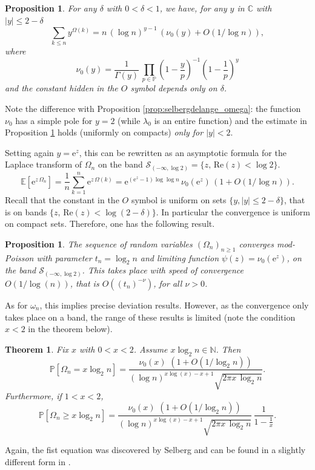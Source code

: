 \documentclass[12pt,a4paper,reqno]{amsart}
\newtheorem{theorem}[lemma]{Theorem}
\newtheorem{proposition}[lemma]{Proposition}
\theoremstyle{remark}
\newcommand{\N}{\mathbb{N}}
\newcommand{\C}{\mathbb{C}}
\newcommand{\E}{\mathrm{e}}
\newcommand{\esper}{\mathbb{E}}
\newcommand{\proba}{\mathbb{P}}
\renewcommand{\Re}{\mathrm{Re}}
\begin{document}
\begin{proposition}\cite[Section II.6, Theorem 2]{Ten95}
For any $\delta$ with $0<\delta<1$, we have, for any $y$ in $\C$ with $|y| \le 2-\delta$
\[ \sum_{k \le n} y^{\Omega(k)} = n\, (\log n)^{y-1} \, (\nu_0(y) +O(1/\log n)), \]
where
\[\nu_0(y)= \frac{1}{\Gamma(y)} \, \prod_{p \in \mathbb{P}} \left(1 - \frac{y}{p} \right)^{-1}\left( 1- \frac{1}{p} \right)^y \]
and the constant hidden in the $O$ symbol depends only on $\delta$.
\label{prop:selbergdelange_Omega}
\end{proposition}

\noindent Note the difference with Proposition \ref{prop:selbergdelange_omega}: the function $\nu_0$ has a simple pole for $y=2$ (while $\lambda_0$ is an entire function) and the estimate in Proposition \ref{prop:selbergdelange_Omega} holds (uniformly on compacts) {\em only for $|y| < 2$}.\bigskip

Setting again $y=\E^z$, this can be rewritten as an asymptotic formula for the Laplace transform of $\Omega_{n}$
 on the band $\mathcal{S}_{(-\infty,\log 2)}=\{z, \, \Re(z) < \log 2\}$.
\[
    \esper[\E^{z\,\Omega_{n}}] = \frac{1}{n} \sum_{k=1}^n \E^{z\,\Omega(k)} 
= \E^{(\E^z-1) \log \log n}\, \nu_0(\E^z) \,(1+ O(1/\log n)).
\]
Recall that the constant in the $O$ symbol is uniform on sets $\{y, |y| \le 2-\delta\}$, that is on bands $\{z,\, \Re(z) < \log(2-\delta)\}$. In particular the convergence is uniform on compact sets. Therefore, one has the following result.
\begin{proposition}
The sequence of random variables $(\Omega_n)_{ n \ge 1}$ converges mod-Poisson with parameter $t_n=\log_2 n$ and limiting function $\psi(z)=\nu_0(\E^z)$, on the band $\mathcal{S}_{(-\infty,\log 2)}$. This takes place with speed of convergence $O(1/\log(n))$, that is $O((t_n)^{-\nu})$, for all $\nu >0$.
\end{proposition}
\bigskip

As for $\omega_n$, this implies precise deviation results. However, as the convergence only takes place on a band,
the range of these results is limited (note the condition $x<2$ in the theorem below).
\begin{theorem}
    Fix $x$ with $0<x<2$. Assume $x \log_2 n \in \N$. Then
    \begin{equation}
        \proba[\Omega_n=x \log_2 n] =
        \frac{ \nu_0(x)\,\,(1 +O(1/\log_2 n))}{(\log n)^{x \log(x)-x+1} \sqrt{2 \pi x \,\log_2 n}}.
    \label{eq:LLL_Omega}
\end{equation}
    Furthermore, if $1<x<2$,
    \begin{equation}
        \proba[\Omega_n \ge x \log_2 n ] =
        \frac{ \nu_0(x)\,\,(1 +O(1/\log_2 n))}{(\log n )^{x \log(x)-x+1} \sqrt{2 \pi x \,\log_2 n}}\, \frac{1}{1-\frac{1}{x}}.
    \label{eq:deviations_Omega}
\end{equation}
\end{theorem}
\noindent Again, the fist equation was discovered by Selberg \cite{Selberg54} and can be found in a slightly different form in \cite[Section II.6, Theorem 5]{Ten95}.
\end{document}
